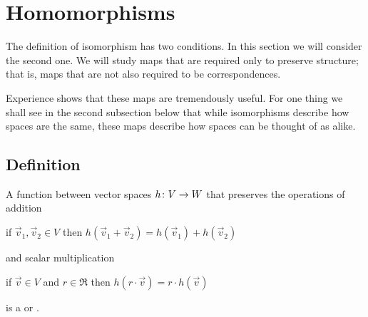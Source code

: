 \section{Homomorphisms}
The definition of isomorphism has two conditions.
In this section we will consider the second one.
We will study maps that 
are required only to preserve structure;
that is, maps that are not also required to be correspondences. 

Experience shows that these maps are 
tremendously useful.
For one thing we shall see in the second subsection below
that while isomorphisms describe how spaces are the same,
these maps describe how spaces can be thought of as alike.








\subsection{Definition}

\begin{definition}  \label{def:Homo}
A function between vector spaces \( \mbox{$h\colon V\to W$} \) that 
preserves 
the operations of addition
\begin{center}
  if \( \vec{v}_1,\vec{v}_2\in V \) then
      \( h(\vec{v}_1+\vec{v}_2)=h(\vec{v}_1)+h(\vec{v}_2) \)
\end{center}
and scalar multiplication
\begin{center}
      if \( \vec{v}\in V \) and \( r\in\Re \) then
      \( h(r\cdot\vec{v})=r\cdot h(\vec{v}) \)
\end{center}
is a %
%
or .
\end{definition}

